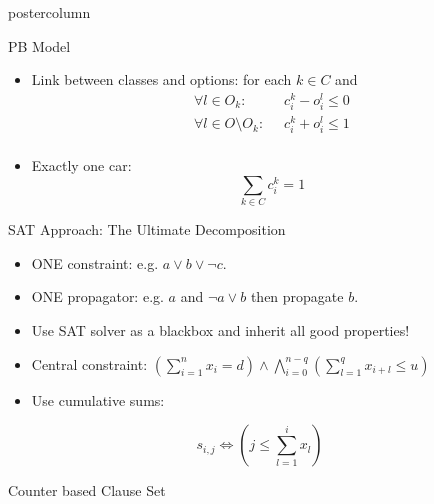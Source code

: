 \documentclass[final]{beamer}
\begin{document}
\begin{frame}
\begin{columns}
\begin{column}{.49\textwidth}
\begin{beamercolorbox}[center,wd=\textwidth]{postercolumn}
\begin{minipage}[T]{.95\textwidth}
{\begin{block}{PB Model}
                \begin{itemize}
                    \item Link between classes and options: for each $k\in C$ and 
                        \begin{align*}
                            \forall l \in O_k :\;\; & c^k_i - o^l_i \leq 0 \\
                            \forall l \in O \setminus O_k :\;\; &c^k_i + o^l_i \leq 1\\
                        \end{align*}
                    \item Exactly one car:  $$\sum_{k\in C} c^k_i = 1$$  
                \end{itemize}
            \end{block}
            \vfill
            \begin{block}{SAT Approach: The Ultimate Decomposition}
                \begin{itemize}
                \itemsep1pt\parskip0pt
                \item
                  ONE constraint: e.g. $a \vee b \vee \neg c$.
                \item
                  ONE propagator: e.g. $a$ and $\neg a \vee b$ then propagate $b$.
                \item
                  Use SAT solver as a blackbox and inherit all good properties!
                \item
                  Central constraint: $(\sum_{i=1}^n x_{i} = d) \wedge\bigwedge_{i=0}^{n-q}(\sum_{l=1}^q x_{i+l} \leq u )$
                \item
                  Use cumulative sums:
                \end{itemize}

                    $$ s_{i,j} \iff (j \leq \sum_{l=1}^{i} x_{l}) $$
                
                

            \end{block}
            \vfill
            \begin{block}{Counter based Clause Set}%
                \begin{center}
                                          
\end{center}
\end{block}}
\end{minipage}
\end{beamercolorbox}
\end{column}
\end{columns}
\end{frame}
\end{document}
